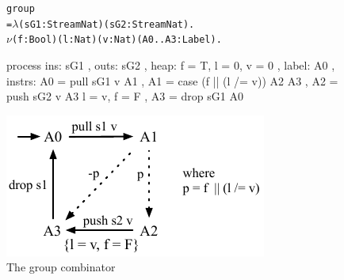 \begin{figure}

\begin{center}
\begin{alltt}
           group 
             = \(\lambda\) (sG1: Stream Nat) (sG2: Stream Nat). 
               \(\nu\) (f: Bool) (l: Nat) (v: Nat) (A0..A3: Label).
\end{alltt}
\begin{code}
               process
               { ins:    { sG1 }
               , outs:   { sG2 }
               , heap:   { f = T, l = 0, v = 0 }
               , label:  A0
               , instrs: { A0 = pull sG1 v           A1 {}
                         , A1 = case (f || (l /= v)) A2 {}  A3 {}
                         , A2 = push sG2 v           A3 { l = v, f = F }
                         , A3 = drop sG1             A0 {} } }
\end{code}
\end{center}
\vspace{1em}
\includegraphics[scale=1.1]{figures/state-group.pdf}
\caption{The group combinator}
\label{fig:Process:Group}
\end{figure}


